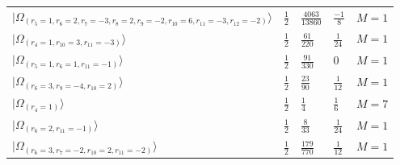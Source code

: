 \documentclass[11pt,twoside,openright]{book}
\begin{document}
\begin{longtable}{p{4cm}llll}
$|\Omega_{(r_{5}=1, r_{6}=2, r_{7}=-3, r_{8}=2, r_{9}=-2, r_{10}=6, r_{11}=-3, r_{12}=-2)}\rangle$ & $\frac{1}{2}$ & $\frac{4063}{13860}$ & $\frac{-1}{8}$ & $M=1$ \\
$|\Omega_{(r_{4}=1, r_{10}=3, r_{11}=-3)}\rangle$ & $\frac{1}{2}$ & $\frac{61}{220}$ & $\frac{1}{24}$ & $M=1$ \\
$|\Omega_{(r_{5}=1, r_{6}=1, r_{11}=-1)}\rangle$ & $\frac{1}{2}$ & $\frac{91}{330}$ & $0$ & $M=1$ \\
$|\Omega_{(r_{6}=3, r_{9}=-4, r_{10}=2)}\rangle$ & $\frac{1}{2}$ & $\frac{23}{90}$ & $\frac{1}{12}$ & $M=1$ \\
$|\Omega_{(r_{4}=1)}\rangle$ & $\frac{1}{2}$ & $\frac{1}{4}$ & $\frac{1}{6}$ & $M=7$ \\
$|\Omega_{(r_{6}=2, r_{11}=-1)}\rangle$ & $\frac{1}{2}$ & $\frac{8}{33}$ & $\frac{1}{24}$ & $M=1$ \\
$|\Omega_{(r_{6}=3, r_{7}=-2, r_{10}=2, r_{11}=-2)}\rangle$ & $\frac{1}{2}$ & $\frac{179}{770}$ & $\frac{1}{12}$ & $M=1$ \\
\bottomrule
\end{longtable}
\end{document}
